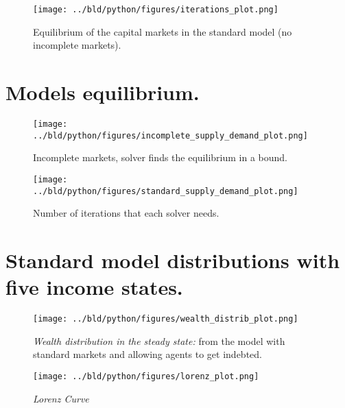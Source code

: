 \documentclass[a4paper,12pt]{article}
\begin{document}
\vspace{1cm}

\begin{figure}[htbp]
        \centering
        \texttt{[image: ../bld/python/figures/iterations\_plot.png]}
        \caption{Equilibrium of the capital markets in the standard model (no incomplete markets).}
        \label{fig:2}
\end{figure}


\clearpage

\section{Models equilibrium.} %

\begin{figure}[htbp]
        \centering
        \texttt{[image: ../bld/python/figures/incomplete\_supply\_demand\_plot.png]}
        \label{fig:3}
        \caption{Incomplete markets, solver finds the equilibrium in a bound.}
\end{figure}

\vspace{1cm}

\begin{figure}[htbp]
        \centering
        \texttt{[image: ../bld/python/figures/standard\_supply\_demand\_plot.png]}
        \caption{Number of iterations that each solver needs.}
        \label{fig:4}
\end{figure}

\clearpage

\section{Standard model distributions with five income states.}

\begin{figure}[h]

    \centering
    \texttt{[image: ../bld/python/figures/wealth\_distrib\_plot.png]}

    \caption{\emph{Wealth distribution in the steady state:}  from the model with standard markets and allowing agents to get indebted. }
    \label{fig:5}

\end{figure}

\vspace{1cm}

\begin{figure}[h]

    \centering
    \texttt{[image: ../bld/python/figures/lorenz\_plot.png]}

    \caption{\emph{Lorenz Curve} }
    \label{fig:6}

\end{figure}


\clearpage


\begin{singlespace}

\end{singlespace}
\end{document}
